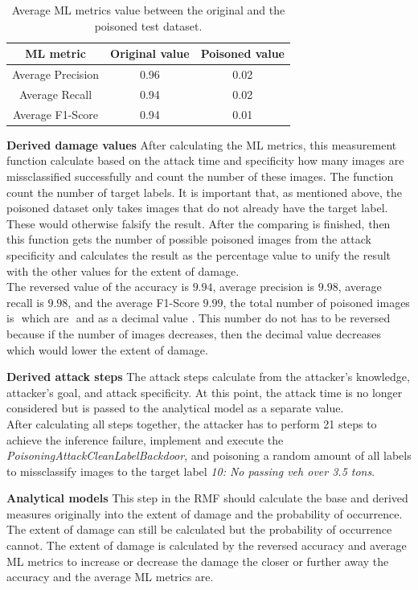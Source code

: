 \begin{table}[ht!]
  \centering
  \begin{tabular}{| c | c | c |}
  \hline
  \rowcolor{lightgray} ML metric & Original value & Poisoned value \\ [0.5ex]
  \hline
  Average Precision & 0.96 & 0.02 \\
  \hline
  Average Recall & 0.94 & 0.02 \\
  \hline
  Average F1-Score & 0.94 & 0.01 \\
  \hline
  \end{tabular}
  \caption{Average ML metrics value between the original and the poisoned test dataset.}
  \label{tab:ml_metrics}
\end{table}

\noindent\textbf{Derived damage values} After calculating the ML metrics, this measurement function calculate based on the attack time and specificity how many images are missclassified successfully and count the number of these images. The function count the number of target labels. It is important that, as mentioned above, the poisoned dataset only takes images that do not already have the target label. These would otherwise falsify the result. After the comparing is finished, then this function gets the number of possible poisoned images from the attack specificity and calculates the result as the percentage value to unify the result with the other values for the extent of damage. \\
The reversed value of the accuracy is $9.94$, average precision is $9.98$, average recall is $9.98$, and the average F1-Score $9.99$, the total number of poisoned images is $ $ which are $ $ and as a decimal value $ $. This number do not has to be reversed because if the number of images decreases, then the decimal value decreases which would lower the extent of damage.

\noindent\textbf{Derived attack steps} The attack steps calculate from the attacker's knowledge, attacker's goal, and attack specificity. At this point, the attack time is no longer considered but is passed to the analytical model as a separate value. \\
After calculating all steps together, the attacker has to perform 21 steps to achieve the inference failure, implement and execute the \textit{PoisoningAttackCleanLabelBackdoor}, and poisoning a random amount of all labels to missclassify images to the target label \textit{10: No passing veh over 3.5 tons}.

\noindent\textbf{Analytical models} This step in the RMF should calculate the base and derived measures originally into the extent of damage and the probability of occurrence. The extent of damage can still be calculated but the probability of occurrence cannot. The extent of damage is calculated by the reversed accuracy and average ML metrics to increase or decrease the damage the closer or further away the accuracy and the average ML metrics are.

